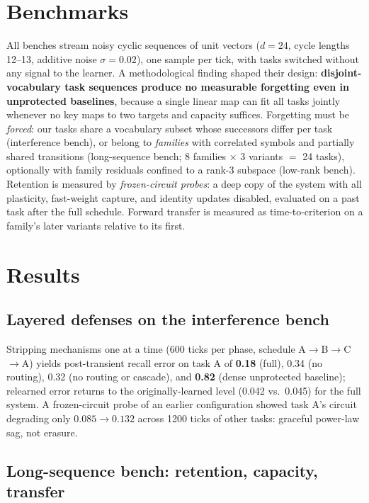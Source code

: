 \documentclass[11pt]{article}
\begin{document}
\section{Benchmarks}
\label{sec:benches}

All benches stream noisy cyclic sequences of unit vectors
($d{=}24$, cycle lengths 12--13, additive noise $\sigma{=}0.02$), one
sample per tick, with tasks switched without any signal to the learner.
A methodological finding shaped their design: \textbf{disjoint-vocabulary
task sequences produce no measurable forgetting even in unprotected
baselines}, because a single linear map can fit all tasks jointly whenever
no key maps to two targets and capacity suffices. Forgetting must be
\emph{forced}: our tasks share a vocabulary subset whose successors differ
per task (interference bench), or belong to \emph{families} with correlated
symbols and partially shared transitions (long-sequence bench; 8 families
$\times$ 3 variants $=$ 24 tasks), optionally with family residuals
confined to a rank-3 subspace (low-rank bench). Retention is measured by
\emph{frozen-circuit probes}: a deep copy of the system with all
plasticity, fast-weight capture, and identity updates disabled, evaluated
on a past task after the full schedule. Forward transfer is measured as
time-to-criterion on a family's later variants relative to its first.

\section{Results}
\label{sec:results}

\subsection{Layered defenses on the interference bench}
Stripping mechanisms one at a time (600 ticks per phase, schedule
A$\to$B$\to$C$\to$A) yields post-transient recall error on task A of
\textbf{0.18} (full), 0.34 (no routing), 0.32 (no routing or cascade), and
\textbf{0.82} (dense unprotected baseline); relearned error returns to the
originally-learned level (0.042 vs.\ 0.045) for the full system. A
frozen-circuit probe of an earlier configuration showed task A's circuit
degrading only $0.085 \to 0.132$ across 1200 ticks of other tasks:
graceful power-law sag, not erasure.

\subsection{Long-sequence bench: retention, capacity, transfer}
\label{sec:longbench}
\end{document}
